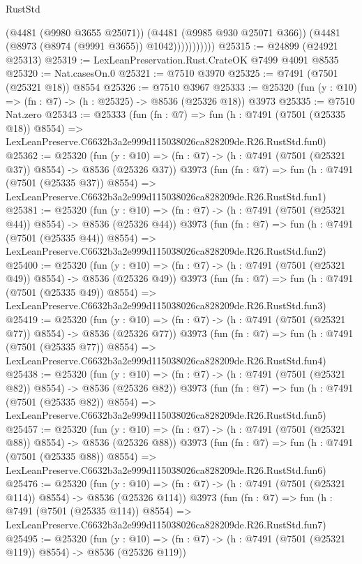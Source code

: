 \begin{lexlean}{RustStd}
\begin{coremodule}
                      (@4481 (@9980 @3655 @25071))
                      (@4481 (@9985 @930 @25071 @366))
                      (@4481 (@8973 (@8974 (@9991 @3655)) @1042)))))))))))
@25315 := @24899 (@24921 @25313)
@25319 := LexLeanPreservation.Rust.CrateOK @7499 @4091 @8535
@25320 := Nat.casesOn.{0}
@25321 := @7510 @3970
@25325 := @7491 (@7501 (@25321 @18)) @8554
@25326 := @7510 @3967
@25333 := @25320 (fun (y : @10) => (fn : @7) -> (h : @25325) -> @8536 (@25326 @18)) @3973
@25335 := @7510 Nat.zero
@25343 := @25333
    (fun (fn : @7) =>
    fun (h : @7491 (@7501 (@25335 @18)) @8554) =>
    LexLeanPreserve.C6632b3a2e999d115038026ca828209de.R26.RustStd.fun0)
@25362 := @25320
    (fun (y : @10) => (fn : @7) -> (h : @7491 (@7501 (@25321 @37)) @8554) -> @8536 (@25326 @37))
    @3973
    (fun (fn : @7) =>
    fun (h : @7491 (@7501 (@25335 @37)) @8554) =>
    LexLeanPreserve.C6632b3a2e999d115038026ca828209de.R26.RustStd.fun1)
@25381 := @25320
    (fun (y : @10) => (fn : @7) -> (h : @7491 (@7501 (@25321 @44)) @8554) -> @8536 (@25326 @44))
    @3973
    (fun (fn : @7) =>
    fun (h : @7491 (@7501 (@25335 @44)) @8554) =>
    LexLeanPreserve.C6632b3a2e999d115038026ca828209de.R26.RustStd.fun2)
@25400 := @25320
    (fun (y : @10) => (fn : @7) -> (h : @7491 (@7501 (@25321 @49)) @8554) -> @8536 (@25326 @49))
    @3973
    (fun (fn : @7) =>
    fun (h : @7491 (@7501 (@25335 @49)) @8554) =>
    LexLeanPreserve.C6632b3a2e999d115038026ca828209de.R26.RustStd.fun3)
@25419 := @25320
    (fun (y : @10) => (fn : @7) -> (h : @7491 (@7501 (@25321 @77)) @8554) -> @8536 (@25326 @77))
    @3973
    (fun (fn : @7) =>
    fun (h : @7491 (@7501 (@25335 @77)) @8554) =>
    LexLeanPreserve.C6632b3a2e999d115038026ca828209de.R26.RustStd.fun4)
@25438 := @25320
    (fun (y : @10) => (fn : @7) -> (h : @7491 (@7501 (@25321 @82)) @8554) -> @8536 (@25326 @82))
    @3973
    (fun (fn : @7) =>
    fun (h : @7491 (@7501 (@25335 @82)) @8554) =>
    LexLeanPreserve.C6632b3a2e999d115038026ca828209de.R26.RustStd.fun5)
@25457 := @25320
    (fun (y : @10) => (fn : @7) -> (h : @7491 (@7501 (@25321 @88)) @8554) -> @8536 (@25326 @88))
    @3973
    (fun (fn : @7) =>
    fun (h : @7491 (@7501 (@25335 @88)) @8554) =>
    LexLeanPreserve.C6632b3a2e999d115038026ca828209de.R26.RustStd.fun6)
@25476 := @25320
    (fun (y : @10) => (fn : @7) -> (h : @7491 (@7501 (@25321 @114)) @8554) -> @8536 (@25326 @114))
    @3973
    (fun (fn : @7) =>
    fun (h : @7491 (@7501 (@25335 @114)) @8554) =>
    LexLeanPreserve.C6632b3a2e999d115038026ca828209de.R26.RustStd.fun7)
@25495 := @25320
    (fun (y : @10) => (fn : @7) -> (h : @7491 (@7501 (@25321 @119)) @8554) -> @8536 (@25326 @119))

\end{coremodule}
\end{lexlean}

